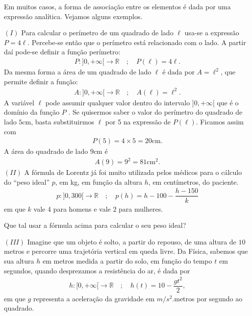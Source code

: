 Em muitos casos, a forma de associação entre os elementos é dada por uma expressão analítica. Vejamos alguns exemplos.

\((I)\) Para calcular o perímetro de um quadrado de lado \(\ell\) usa-se a expressão \(P=4\ell\). Percebe-se então que o perímetro está relacionado com o lado. A partir daí pode-se definir a função perímetro:
\begin{equation*}
\begin{split}P: ]0,+\infty[\to \mathbb{R} \quad ; \quad P(\ell)=4\ell.\end{split}
\end{equation*}
Da mesma forma a área de um quadrado de lado \(\ell\) é dada por \(A=\ell^2\), que permite definir a função:
\begin{equation*}
\begin{split}A: ]0,+\infty[\to \mathbb{R} \quad ; \quad A(\ell)=\ell^2.\end{split}
\end{equation*}
A variável \(\ell\) pode assumir qualquer valor dentro do intervalo \(]0,+\infty[\) que é o domínio da função \(P\) . Se quisermos saber o valor do perímetro do quadrado de lado $5$cm, basta substituirmos \(\ell\) por 5 na expressão de  \(P(\ell)\). Ficamos assim com
\begin{equation*}
\begin{split}P(5)=4\times 5 = 20\mathrm{cm}.\end{split}
\end{equation*}
A área do quadrado de lado $9$cm é
\begin{equation*}
\begin{split}A(9)=9^2=81\text{cm}^2.\end{split}
\end{equation*}
\((II)\) A fórmula de Lorentz já foi muito utilizada pelos médicos para o cálculo do “peso ideal” \(p\), em kg, em função da altura \(h\), em centímetros, do paciente.
\begin{equation*}
\begin{split}p:]0,300[\to \mathbb{R}\quad ; \quad p(h)=h-100-\dfrac{h-150}{k}\end{split}
\end{equation*}
em que \(k\) vale 4 para homens e vale 2 para mulheres.

Que tal usar a fórmula acima para calcular o seu peso ideal?

\((III)\) Imagine que um objeto é solto, a partir do repouso, de uma altura de \(10\) metros e percorre uma trajetória vertical em queda livre. Da Física, sabemos que sua altura \(h\) em metros medida a partir do solo, em função do tempo \(t\) em segundos, quando desprezamos a resistência do ar, é dada por
\begin{equation*}
\begin{split}h:[0,+\infty[\to \mathbb{R}\quad ; \quad h(t)=10-\dfrac{gt^2}{2},\end{split}
\end{equation*}
em que \(g\) representa a aceleração da gravidade em \(m/s^2\).metros por segundo ao quadrado.

